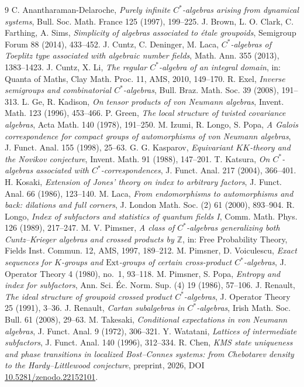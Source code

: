 \documentclass[11pt]{amsart}
\numberwithin{equation}{section}
\theoremstyle{definition}
\theoremstyle{remark}
\newcommand{\Z}{\mathbb{Z}}
\begin{document}
\begin{thebibliography}{9}
 C. Anantharaman-Delaroche, \emph{Purely infinite $C^*$-algebras arising from dynamical systems}, Bull. Soc. Math. France 125 (1997), 199--225.
 J. Brown, L. O. Clark, C. Farthing, A. Sims, \emph{Simplicity of algebras associated to \'etale groupoids}, Semigroup Forum 88 (2014), 433--452.
 J. Cuntz, C. Deninger, M. Laca, \emph{$C^*$-algebras of Toeplitz type associated with algebraic number fields}, Math. Ann. 355 (2013), 1383--1423.
 J. Cuntz, X. Li, \emph{The regular $C^*$-algebra of an integral domain}, in: Quanta of Maths, Clay Math. Proc. 11, AMS, 2010, 149--170.
 R. Exel, \emph{Inverse semigroups and combinatorial $C^*$-algebras}, Bull. Braz. Math. Soc. 39 (2008), 191--313.
 L. Ge, R. Kadison, \emph{On tensor products of von Neumann algebras}, Invent. Math. 123 (1996), 453--466.
 P. Green, \emph{The local structure of twisted covariance algebras}, Acta Math. 140 (1978), 191--250.
 M. Izumi, R. Longo, S. Popa, \emph{A Galois correspondence for compact groups of automorphisms of von Neumann algebras}, J. Funct. Anal. 155 (1998), 25--63.
 G. G. Kasparov, \emph{Equivariant $KK$-theory and the Novikov conjecture}, Invent. Math. 91 (1988), 147--201.
 T. Katsura, \emph{On $C^*$-algebras associated with $C^*$-correspondences}, J. Funct. Anal. 217 (2004), 366--401.
 H. Kosaki, \emph{Extension of Jones' theory on index to arbitrary factors}, J. Funct. Anal. 66 (1986), 123--140.
 M. Laca, \emph{From endomorphisms to automorphisms and back: dilations and full corners}, J. London Math. Soc. (2) 61 (2000), 893--904.
 R. Longo, \emph{Index of subfactors and statistics of quantum fields I}, Comm. Math. Phys. 126 (1989), 217--247.
 M. V. Pimsner, \emph{A class of $C^*$-algebras generalizing both Cuntz--Krieger algebras and crossed products by $\Z$}, in: Free Probability Theory, Fields Inst. Commun. 12, AMS, 1997, 189--212.
 M. Pimsner, D. Voiculescu, \emph{Exact sequences for $K$-groups and $\mathrm{Ext}$-groups of certain cross-product $C^*$-algebras}, J. Operator Theory 4 (1980), no.~1, 93--118.
 M. Pimsner, S. Popa, \emph{Entropy and index for subfactors}, Ann. Sci. \'Ec. Norm. Sup. (4) 19 (1986), 57--106.
 J. Renault, \emph{The ideal structure of groupoid crossed product $C^*$-algebras}, J. Operator Theory 25 (1991), 3--36.
 J. Renault, \emph{Cartan subalgebras in $C^*$-algebras}, Irish Math. Soc. Bull. 61 (2008), 29--63.
 M. Takesaki, \emph{Conditional expectations in von Neumann algebras}, J. Funct. Anal. 9 (1972), 306--321.
 Y. Watatani, \emph{Lattices of intermediate subfactors}, J. Funct. Anal. 140 (1996), 312--334.
 R. Chen, \emph{KMS state uniqueness and phase transitions in localized Bost--Connes systems: from Chebotarev density to the Hardy--Littlewood conjecture}, preprint, 2026, DOI \href{https://doi.org/10.5281/zenodo.22152101}{10.5281/zenodo.22152101}.
\end{thebibliography}
\end{document}
